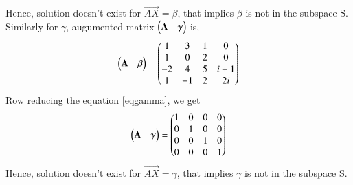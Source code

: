 \documentclass[journal,12pt,twocolumn]{IEEEtran}
\begin{document}
Hence, solution doesn't exist for $\vec{AX}=\beta$, that implies $\beta$ is not in the subspace S.\\
Similarly for $\gamma$, augumented matrix $\begin{pmatrix}\mathbf{A}&\gamma\end{pmatrix}$ is,
\begin{align}\label{eqgamma}
\begin{pmatrix}\mathbf{A}&\beta\end{pmatrix}=\begin{pmatrix}1&3&1&0\\1&0&2&0\\-2&4&5&i+1\\1&-1&2&2i\end{pmatrix} 
\end{align}
Row reducing the equation \eqref{eqgamma}, we get
\begin{align}
\begin{pmatrix}\mathbf{A}&\gamma\end{pmatrix}= \begin{pmatrix}1&0&0&0\\0&1&0&0\\0&0&1&0\\0&0&0&1\end{pmatrix}
\end{align}
Hence, solution doesn't exist for $\vec{AX}=\gamma$, that implies $\gamma$ is not in the subspace S.
\end{document}
